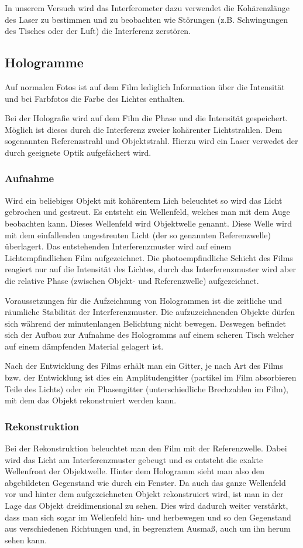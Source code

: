 \documentclass[12pt]{article}
\begin{document}
In unserem Versuch wird das Interferometer dazu verwendet die Kohärenzlänge des Laser zu bestimmen und zu beobachten wie Störungen
(z.B. Schwingungen des Tisches oder der Luft) die Interferenz zerstören.
\subsection{Hologramme}
Auf normalen Fotos ist auf dem Film lediglich Information über die Intensität und bei Farbfotos die Farbe des Lichtes enthalten.

Bei der Holografie wird auf dem Film die Phase und die Intensität gespeichert. Möglich ist dieses durch die Interferenz zweier kohärenter Lichtstrahlen.
Dem sogenannten Referenzstrahl und Objektstrahl. Hierzu wird ein Laser verwedet der durch geeignete Optik aufgefächert wird.
\subsubsection{Aufnahme}
Wird ein beliebiges Objekt mit kohärentem Lich beleuchtet so wird das Licht gebrochen und gestreut. Es entsteht ein Wellenfeld, welches man mit dem Auge
beobachten kann. Dieses Wellenfeld wird Objektwelle genannt. Diese Welle wird mit dem einfallenden ungestreuten Licht (der so genannten Referenzwelle)
überlagert. Das entstehenden Interferenzmuster wird auf einem Lichtempfindlichen Film aufgezeichnet. Die photoempfindliche Schicht des Films reagiert nur auf
die Intensität des Lichtes, durch das Interferenzmuster wird aber die relative Phase (zwischen Objekt- und Referenzwelle) aufgezeichnet.

Voraussetzungen für die Aufzeichnung von Hologrammen ist die zeitliche und räumliche Stabilität der Interferenzmuster. Die aufzuzeichnenden Objekte dürfen
sich während der minutenlangen Belichtung nicht bewegen. Deswegen befindet sich der Aufbau zur Aufnahme des Hologramms auf einem scheren Tisch welcher auf 
einem dämpfenden Material gelagert ist. 

Nach der Entwicklung des Films erhält man ein Gitter, je nach Art des Films bzw. der Entwicklung ist dies ein Amplitudengitter (partikel im Film absorbieren
Teile des Lichts) oder ein Phasengitter (unterschiedliche Brechzahlen im Film), mit dem das Objekt rekonstruiert werden kann.

\subsubsection{Rekonstruktion}
Bei der Rekonstruktion beleuchtet man den Film mit der Referenzwelle. Dabei wird das Licht am Interferenzmuster gebeugt und es entsteht die exakte
Wellenfront der Objektwelle. Hinter dem Hologramm sieht man also den abgebildeten Gegenstand wie durch ein Fenster.
Da auch das ganze Wellenfeld vor und hinter dem aufgezeichneten Objekt rekonstruiert wird, ist man in der Lage das Objekt dreidimensional zu sehen. Dies
wird dadurch weiter verstärkt, dass man sich sogar im Wellenfeld hin- und herbewegen und so den Gegenstand aus verschiedenen Richtungen und, in begrenztem
Ausmaß, auch um ihn herum sehen kann.
\end{document}

